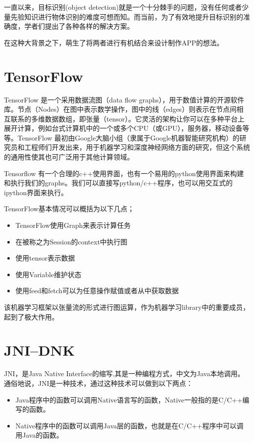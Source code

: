 \documentclass[UTF8, Microsoft YaHei]{book}
\begin{document}
    一直以来，目标识别(object detection)就是一个十分棘手的问题，没有任何或者少量先验知识进行物体识别的难度可想而知。而当前，为了有效地提升目标识别的准确度，学者们提出了各种各样的解决方案。

    在这种大背景之下，萌生了将两者进行有机结合来设计制作APP的想法。


    \section{TensorFlow}
    TensorFlow 是一个采用数据流图（data flow graphs），用于数值计算的开源软件库。节点（Nodes）在图中表示数学操作，图中的线（edges）则表示在节点间相互联系的多维数据数组，即张量（tensor）。它灵活的架构让你可以在多种平台上展开计算，例如台式计算机中的一个或多个CPU（或GPU），服务器，移动设备等等。TensorFlow 最初由Google大脑小组（隶属于Google机器智能研究机构）的研究员和工程师们开发出来，用于机器学习和深度神经网络方面的研究，但这个系统的通用性使其也可广泛用于其他计算领域。

    Tensorflow 有一个合理的c++使用界面，也有一个易用的python使用界面来构建和执行我们的graphs。我们可以直接写python/c++程序，也可以用交互式的ipython界面来执行。

    TensorFlow基本情况可以概括为以下几点；

     \begin{itemize}
      \item TensorFlow使用Graph来表示计算任务
      \item 在被称之为Session的context中执行图
      \item 使用tensor表示数据
      \item 使用Variable维护状态
      \item 使用feed和fetch可以为任意操作赋值或者从中获取数据
    \end{itemize}

    该机器学习框架以张量流的形式进行图运算，作为机器学习library中的重要成员，起到了极大作用。
   
    \section{JNI--DNK}
    JNI，是Java Native Interface的缩写,其是一种编程方式，中文为Java本地调用。通俗地说，JNI是一种技术，通过这种技术可以做到以下两点：

    \begin{itemize}
      \item Java程序中的函数可以调用Native语言写的函数，Native一般指的是C/C++编写的函数。
      \item Native程序中的函数可以调用Java层的函数，也就是在C/C++程序中可以调用Java的函数。
    \end{itemize}
\end{document}
